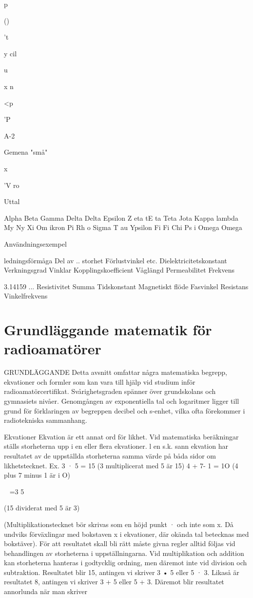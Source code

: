 \documentclass[a4paper,twoside,twocolumn,openright]{book}
\begin{document}
{{{{p

()

't

y
cil

u

x
n

<p

'P

A-2

Gemena
"små"

x

'V
ro

Uttal

Alpha
Beta
Gamma
Delta
Delta
Epsilon
Z eta
tE ta
Teta
Jota
Kappa
lambda
My
Ny
Xi
Om ikron
Pi
Rh o
Sigma
T au
Ypsilon
Fi
Fi
Chi
Ps i
Omega
Omega

Användningsexempel

ledningsförmåga
Del av .. storhet
Förlustvinkel etc.
Dielektricitetskonstant
Verkningsgrad
Vinklar
Kopplingskoefficient
Våglängd
Permeabilitet
Frekvens

3.14159 ...
Resistivitet
Summa
Tidskonstant
Magnetiskt flöde
Fasvinkel
Resistans
Vinkelfrekvens

\chapter{Grundläggande matematik för radioamatörer}

GRUNDLÄGGANDE
Detta avsnitt omfattar några matematiska
begrepp, ekvationer och formler som kan
vara till hjälp vid studium inför radioamatörcertifikat. Svårighetsgraden spänner över
grundskolans och gymnasiets nivåer.
Genomgången av exponentiella tal och
logaritmer ligger till grund för förklaringen av
begreppen decibel och s-enhet, vilka ofta
förekommer i radiotekniska sammanhang.

Ekvationer
Ekvation är ett annat ord för likhet. Vid matematiska beräkningar ställs storheterna upp i
en eller flera ekvationer.
l en s.k. sann ekvation har resultatet av
de uppställda storheterna samma värde på
båda sidor om likhetstecknet.
Ex. 3 · 5 = 15 (3 multiplicerat med 5 är 15)
4 + 7- 1 = 1O (4 plus 7 minus 1 är i O)

~ =3
5

(15 dividerat med 5 är 3)

(Multiplikationstecknet bör skrivas som
en höjd punkt · och inte som x. Då undviks
förväxlingar med bokstaven x i ekvationer,
där okända tal betecknas med bokstäver).
För att resultatet skall bli rätt måste givna
regler alltid följas vid behandlingen av storheterna i uppställningarna.
Vid multiplikation och addition kan storheterna hanteras i godtycklig ordning, men
däremot inte vid division och subtraktion.
Resultatet blir 15, antingen vi skriver 3 • 5
eller 5 · 3.
Likaså är resultatet 8, antingen vi skriver
3 + 5 eller 5 + 3.
Däremot blir resultatet annorlunda när man
skriver

}}}}
\end{document}

